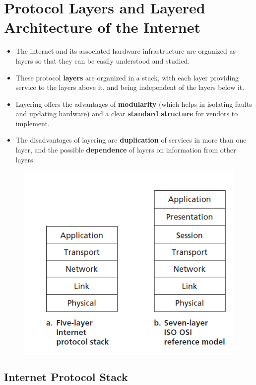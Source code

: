 \documentclass{article}
\theoremstyle{plain}
\theoremstyle{definition}
\begin{document}
\section{Protocol Layers and Layered Architecture of the Internet}
\begin{itemize}
    \item The internet and its associated hardware infrastructure are organized as layers so that they can be easily understood and studied.
    
    \item These protocol \textbf{layers} are organized in a stack, with each layer providing service to the layers above it, and being independent of the layers below it. 
    
    \item Layering offers the advantages of \textbf{modularity} (which helps in isolating faults and updating hardware) and a clear \textbf{standard structure} for vendors to implement.
    
    \item The disadvantages of layering are \textbf{duplication} of services in more than one layer, and the possible \textbf{dependence} of layers on information from other layers.
\end{itemize}
\begin{figure}
    \centering
    \includegraphics{cn11.png}
    \label{fig:my_label_11}
\end{figure}

\subsection{Internet Protocol Stack}
\end{document}
